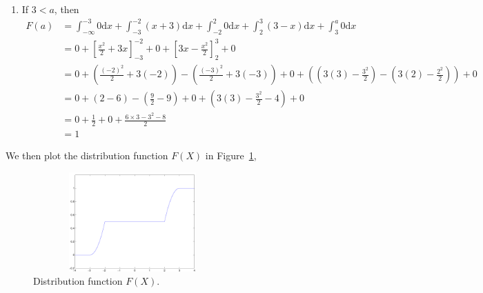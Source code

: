 \documentclass[11pt]{article} %
\begin{document}
\begin{enumerate}
\item If $3 < a$, then
\begin{align*}
F(a) & = \int_{-\infty}^{-3} 0 \text{d} x + \int_{-3}^{-2} (x+3) \text{d} x + \int_{-2}^{2} 0 \text{d} x + \int_{2}^3 (3-x) \text{d} x + \int_{3}^a 0 \text{d} x \\
& = 0 + \left[ \frac{x^2}{2} + 3x\right]_{-3}^{-2} + 0 + \left[3x - \frac{x^2}{2} \right]_{2}^3 + 0 \\
& = 0 + \left( \frac{(-2)^2}{2} + 3(-2)\right) - \left( \frac{(-3)^2}{2} + 3(-3) \right) + 0 + \left( \left(3(3)-\frac{3^2}{2} \right) - \left( 3(2) - \frac{2^2}{2}\right) \right) + 0 \\
& = 0 + (2-6) - (\frac{9}{2} - 9) + 0 + \left( 3(3) - \frac{3^2}{2} -4 \right)  + 0\\
& = 0 + \frac{1}{2} + 0 + \frac{6\times 3 - 3^2 -8}{2} \\
& = 1
\end{align*}
\end{enumerate}
We then plot the distribution function $F(X)$ in Figure~\ref{Fig:ch0505b}, 
\begin{figure}[h!]
\centering
\includegraphics[width=3in, height=1.5in]{ch0505b}
\caption{Distribution function $F(X)$.}
\label{Fig:ch0505b}
\end{figure}
\end{document}
